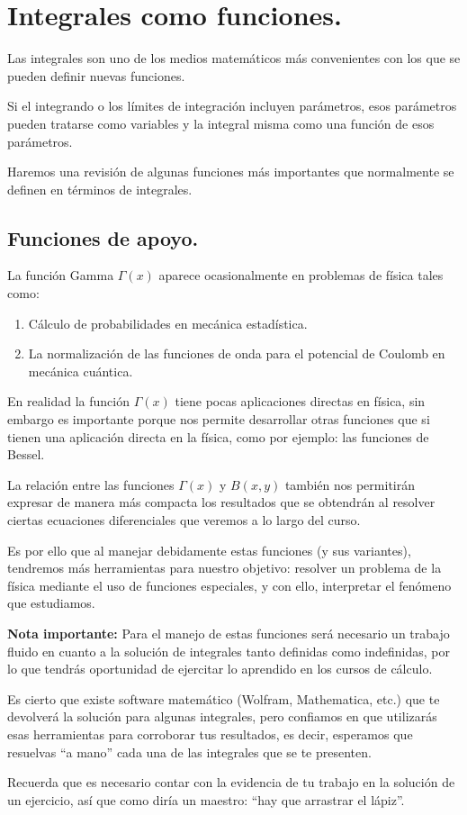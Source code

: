 \section{Integrales como funciones.}

Las integrales son uno de los medios matemáticos más convenientes con los que se pueden definir nuevas funciones.
\par
Si el integrando o los límites de integración incluyen parámetros, esos parámetros pueden tratarse como variables y la integral misma como una función de esos parámetros.
\par
Haremos una revisión de algunas funciones más importantes que normalmente se definen en términos de integrales.

\subsection*{Funciones de apoyo.}

La función Gamma $\Gamma (x)$ aparece ocasionalmente en problemas de física tales como:
\begin{enumerate}
\item Cálculo de probabilidades en mecánica estadística.
\item La normalización de las funciones de onda para el potencial de Coulomb en mecánica cuántica.
\end{enumerate}
En realidad la función $\Gamma (x)$ tiene pocas aplicaciones directas en física, sin embargo es importante porque nos permite desarrollar otras funciones que si tienen una aplicación directa en la física, como por ejemplo: las funciones de Bessel.
\par
La relación entre las funciones $\Gamma (x)$ y $B (x, y)$ también nos permitirán expresar de manera más compacta los resultados que se obtendrán al resolver ciertas ecuaciones diferenciales que veremos a lo largo del curso.
\par
Es por ello que al manejar debidamente estas funciones (y sus variantes), tendremos más herramientas para nuestro objetivo: resolver un problema de la física mediante el uso de funciones especiales, y con ello, interpretar el fenómeno que estudiamos.
\par
\textbf{Nota importante: }Para el manejo de estas funciones será necesario un trabajo fluido en cuanto a la solución de integrales tanto definidas como indefinidas, por lo que tendrás oportunidad de ejercitar lo aprendido en los cursos de cálculo.
\par
Es cierto que existe software matemático (Wolfram, Mathematica, etc.) que te devolverá la solución para algunas integrales, pero confiamos en que utilizarás esas herramientas para corroborar tus resultados, es decir, esperamos que resuelvas \enquote{a mano} cada una de las integrales que se te presenten.
\par
Recuerda que es necesario contar con la evidencia de tu trabajo en la solución de un ejercicio, así que como diría un maestro: \enquote{hay que arrastrar el lápiz}.

